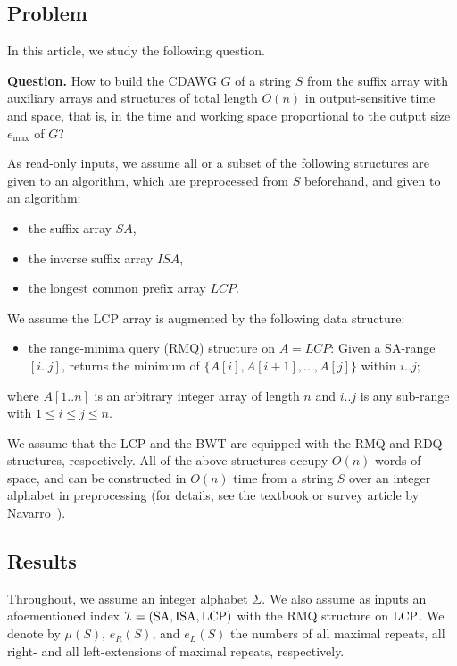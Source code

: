 \documentclass{article}
\begin{document}
\subsection{Problem}
In this article, we study the following question. 

\begin{trivlist}{\item[] \noindent \textbf{Question.}
How to build the CDAWG $G$ of a string $S$ from the suffix array with auxiliary arrays and structures of total length $O(n)$ in output-sensitive time and space, that is, in the time and working space proportional to the output size $e_{\max}$ of $G$?
}\end{trivlist}

As read-only inputs, we assume all or a subset of the following structures are given to an algorithm, which are preprocessed from $S$ beforehand, and given to an algorithm:
\begin{itemize}
\item the suffix array $SA$,
\item the inverse suffix array $ISA$,
\item the longest common prefix array $LCP$.
\end{itemize}

We assume the LCP array is augmented by the following data structure: 
\begin{itemize}
\item the range-minima query (RMQ) structure on $A = LCP$: Given a SA-range $[i..j]$, returns the minimum of $\{A[i], A[i+1], \dots, A[j]\}$ within $i..j$; 
  
\end{itemize}
where $A[1..n]$ is an arbitrary integer array of length $n$ and $i..j$ is any sub-range with $1\le i\le j\le n$. 

We assume that the LCP and the BWT are equipped with the RMQ and RDQ structures, respectively. 
All of the above structures occupy $O(n)$ words of space, and can be constructed in $O(n)$ time from a string $S$ over an integer alphabet in preprocessing (for details, see the textbook or survey article by Navarro~\cite{navarro2016cds:book,navarro2021indexing:ii}).

\subsection{Results}
Throughout, we assume an integer alphabet $\Sigma$.
We also assume as inputs an afoementioned index $\mathcal{I} = (\mathrm{SA}, \mathrm{ISA}, \mathrm{LCP})$ with the RMQ structure on $\mathrm{LCP}$.  We denote by $\mu(S)$, $e_R(S)$, and $e_L(S)$ the numbers of all maximal repeats, all right- and all left-extensions of maximal repeats, respectively.
\end{document}
